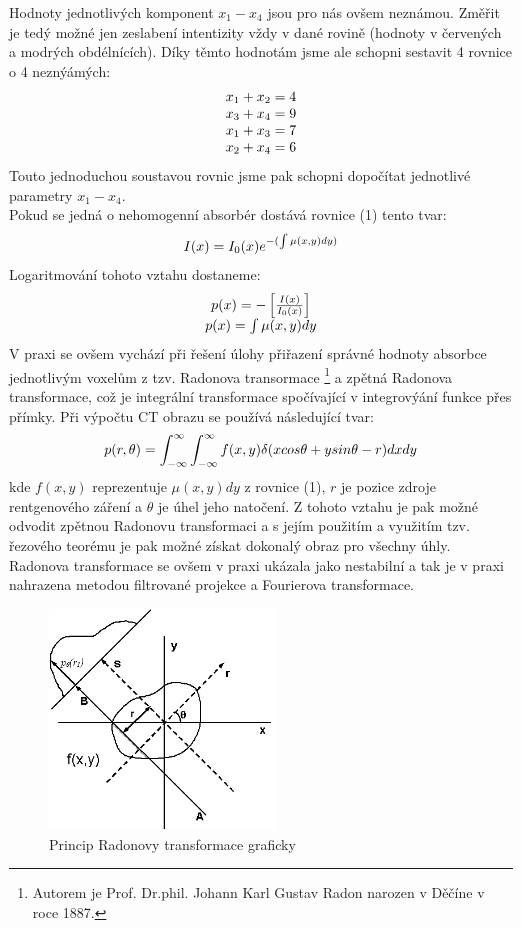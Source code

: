 \documentclass{thesis}%
\begin{document}
Hodnoty jednotlivých komponent $x_{1} - x_{4}$ jsou pro nás ovšem neznámou. Změřit je tedý možné jen zeslabení intentizity vždy v dané rovině (hodnoty v červených a modrých obdélnících). Díky těmto hodnotám jsme ale schopni sestavit 4 rovnice o 4 neznýámých:
\begin{equation}
 \centering
\begin{array}[h]{c}
	x_{1} + x_{2} = 4 \\
	x_{3} + x_{4} = 9 \\
	x_{1} + x_{3} = 7 \\
	x_{2} + x_{4} = 6
\end{array}
\end{equation}
Touto jednoduchou soustavou rovnic jsme pak schopni dopočítat jednotlivé parametry $x_{1} - x_{4}$. \\
Pokud se jedná o nehomogenní absorbér dostává rovnice (1) tento tvar:
\begin{equation}
 \centering
	I(x) = I_{0}(x)e^{-(\int\mu(x,y) dy) }
\end{equation}
Logaritmování tohoto vztahu dostaneme:
\begin{equation}
 \centering
\begin{array}[h!]{c}
	p(x) = -\left[\frac{I(x)}{I_{0}(x)}\right] \\
	p(x) = \int\mu (x,y) dy
\end{array}
\end{equation}
V praxi se ovšem vychází při řešení úlohy přiřazení správné hodnoty absorbce jednotlivým voxelům z tzv. Radonova transormace \footnote[5]{Autorem je Prof. Dr.phil. Johann Karl Gustav Radon narozen v Děčíne v roce 1887.} a zpětná Radonova transformace, což je integrální transformace spočívající v integrovýání funkce přes přímky. Při výpočtu CT obrazu se používá následující tvar:
\begin{equation}
 \centering
	p(r,\theta) = \int_{-\infty}^{\infty}\int_{-\infty}^{\infty} f(x,y) \delta(x cos\theta +y sin \theta - r)dx dy
\end{equation}
kde $f(x,y)$ reprezentuje $\mu (x,y) dy$ z rovnice (1), $r$ je pozice zdroje rentgenového záření a $\theta$ je úhel jeho natočení. Z tohoto vztahu je pak možné odvodit zpětnou Radonovu transformaci a s jejím použitím a využitím tzv. řezového teorému je pak možné získat dokonalý obraz pro všechny úhly. Radonova transformace se ovšem v praxi ukázala jako nestabilní a tak je v praxi nahrazena metodou filtrované projekce a Fourierova transformace.
\begin{figure}[ht!]
 \centering
	\includegraphics[width=6cm]{radonova_transformace.png}
	\caption[Radonova transformace]{Princip Radonovy transformace graficky}
\end{figure}
\end{document}
